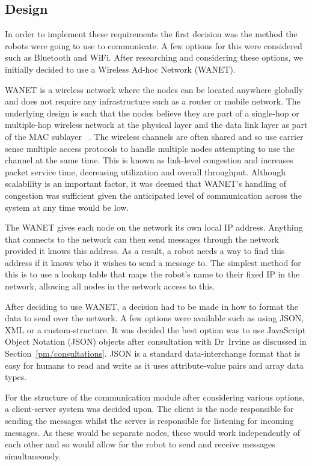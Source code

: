 \subsection{Design}\label{soft/comms/design}
In order to implement these requirements the first decision was the 
method the robots were going to use to communicate. A few options 
for this were considered such as Bluetooth and WiFi. After 
researching  and considering these options, we initially decided to 
use a Wireless Ad-hoc Network (WANET). 

WANET is a wireless network where the nodes can be located anywhere 
globally and does not require any infrastructure such as a router or 
mobile network. The underlying design is such that the nodes believe 
they are part of a single-hop or multiple-hop wireless network at the 
physical layer and the data link layer as part of the MAC sublayer~
\cite{rajesh2015congestion}. The wireless channels are often shared 
and so use carrier sense multiple access protocols to handle multiple 
nodes attempting to use the channel at the same time. This is known 
as link-level congestion and increases packet service time, 
decreasing utilization and overall throughput. Although scalability 
is an important  factor, it was deemed that WANET's handling of 
congestion was sufficient given the anticipated level of 
communication across the system at any time would be low. 

The WANET gives each node on the network its own local IP address. 
Anything that connects to the network can then send messages through 
the network provided it knows this address. As a result, a robot 
needs a way to find this address if it knows who it wishes to send 
a message to. The simplest method for this is to use a lookup table 
that maps the robot's name to their fixed IP in the network, allowing 
all nodes in the network access to this.

After deciding to use WANET, a decision  had to be made in how to format 
the data to send over the network. A few options were available such as 
using JSON, XML or a custom-structure. It was decided the best option was 
to use JavaScript Object Notation (JSON) objects after consultation with 
Dr~Irvine as discussed in Section~\ref{pm/consultations}. JSON is a 
standard data-interchange format that is easy for humans to read and write 
as it uses attribute-value pairs and array data types.

For the structure of the communication module after considering various options, 
a client-server system was decided upon. The client is the node 
responsible for sending the messages whilst the server is responsible 
for listening for incoming messages. As these would be separate nodes, 
these would work independently of each other and so would allow for the 
robot to send and receive messages simultaneously. 

